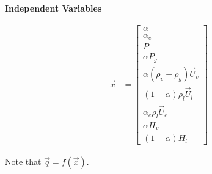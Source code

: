 \begin{minipage}{0.42\textwidth}
\begin{center}\textbf{Independent Variables}\end{center}
\begin{align}
\Vec{x} & = \begin{bmatrix}
\alpha \\
\alpha_e \\
P \\
\alpha P_g \\
\alpha \left( \rho_v + \rho_g \right) \Vec{U}_v \\
\left( 1-\alpha \right) \rho_l \Vec{U}_l \\
\alpha_e  \rho_l \Vec{U}_e \\
\alpha H_v \\
\left( 1-\alpha \right) H_l
\end{bmatrix}
\end{align}
\end{minipage}

Note that $\displaystyle \Vec{q}=f(\Vec{x})$.

